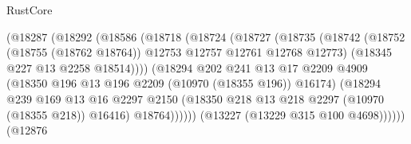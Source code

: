 \begin{lexlean}{RustCore}
\begin{coremodule}
                                  (@18287
                                    (@18292
                                      (@18586
                                        (@18718
                                          (@18724
                                            (@18727
                                              (@18735
                                                (@18742
                                                  (@18752
                                                    (@18755 (@18762 @18764))
                                                    @12753
                                                    @12757
                                                    @12761
                                                    @12768
                                                    @12773)
                                                  (@18345 @227 @13 @2258 @18514))))
                                            (@18294
                                              @202
                                              @241
                                              @13
                                              @17
                                              @2209
                                              @4909
                                              (@18350
                                                @196
                                                @13
                                                @196
                                                @2209
                                                (@10970 (@18355 @196))
                                                @16174)
                                              (@18294
                                                @239
                                                @169
                                                @13
                                                @16
                                                @2297
                                                @2150
                                                (@18350
                                                  @218
                                                  @13
                                                  @218
                                                  @2297
                                                  (@10970 (@18355 @218))
                                                  @16416)
                                                @18764))))))
                                    (@13227 (@13229 @315 @100 @4698))))))
                            (@12876

\end{coremodule}
\end{lexlean}

